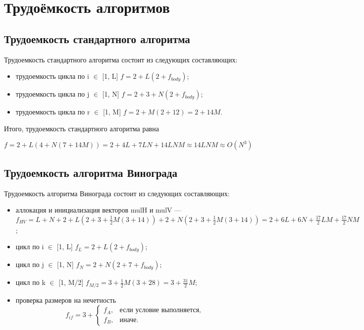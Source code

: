 \section{Трудоёмкость алгоритмов}

\subsection{Трудоемкость стандартного алгоритма}
Трудоемкость стандартного алгоритма состоит из следующих составляющих:

\begin{itemize}
	\item трудоемкость цикла по i $\in$ [1, L] $f = 2 + L(2 + f_{body})$;
	\item трудоемкость цикла по j $\in$ [1, N] $f = 2 + 3 + N(2 + f_{body})$;
	\item трудоемкость цикла по r $\in$ [1, M] $f = 2 + M(2 + 12) = 2 + 14M$.
\end{itemize}

Итого, трудоемкость стандартного алгоритма равна

	$ f = 2 + L(4 + N(7 + 14M)) = 2 + 4L + 7LN + 14LNM \approx 14LNM \approx O(N^3) $

\subsection{Трудоемкость алгоритма Винограда}

Трудоемкость алгоритма Винограда состоит из следующих составляющих:
\begin{itemize}
	\item аллокация и инициализация векторов mulH и mulV --- $f_{HV} = L + N + 2 + L(2 + 3 + \frac{1}{2}M(3 + 14)) + 2 + N(2 + 3 + \frac{1}{2}M(3 + 14)) = 2 + 6L + 6N + \frac{17}{2}LM + \frac{17}{2}NM$;
	\item цикл по i $\in$ [1, L] $f_{L} = 2 + L(2 + f_{body})$;
	\item цикл по j $\in$ [1, N] $f_{N} = 2 + N(2 + 7 + f_{body})$;
	\item цикл по k $\in$ [1, M/2] $f_{M/2} = 3 + \frac{1}{2}M(3 + 28) = 3 + \frac{31}{2}M$;
	\item проверка размеров на нечетность
	\begin{equation}
		f_{if} = 3 + 
		\begin{cases}
			f_A, & \text{если условие выполняется,}\\
			f_B, & \text{иначе.}
		\end{cases}
	\end{equation}
\end{itemize}

